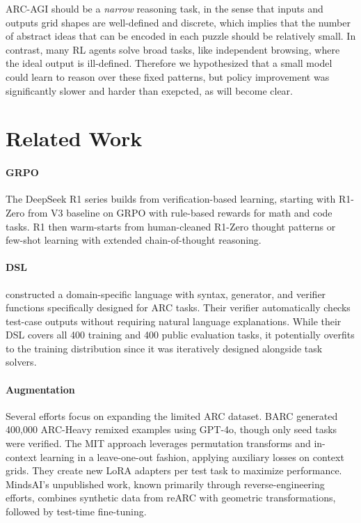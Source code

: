 \documentclass{article}
\begin{document}
ARC-AGI should be a \textit{narrow} reasoning task, in the sense that inputs and outputs grid shapes are well-defined and discrete, which implies that the number of abstract ideas that can be encoded in each puzzle should be relatively small. In contrast, many RL agents solve broad tasks, like independent browsing, where the ideal output is ill-defined. Therefore we hypothesized that a small model could learn to reason over these fixed patterns, but policy improvement was significantly slower and harder than exepcted, as will become clear.

\section{Related Work}

\paragraph{GRPO} The DeepSeek R1 series \cite{r1} builds from verification-based learning, starting with R1-Zero from V3 baseline on GRPO with rule-based rewards for math and code tasks. R1 then warm-starts from human-cleaned R1-Zero thought patterns or few-shot learning with extended chain-of-thought reasoning.

\paragraph{DSL} \cite{Hodel} constructed a domain-specific language with syntax, generator, and verifier functions specifically designed for ARC tasks. Their verifier automatically checks test-case outputs without requiring natural language explanations. While their DSL covers all 400 training and 400 public evaluation tasks, it potentially overfits to the training distribution since it was iteratively designed alongside task solvers.

\paragraph{Augmentation} Several efforts focus on expanding the limited ARC dataset. BARC \cite{barc} generated 400,000 ARC-Heavy remixed examples using GPT-4o, though only seed tasks were verified. The MIT approach \cite{MIT} leverages permutation transforms and in-context learning in a leave-one-out fashion, applying auxiliary losses on context grids. They create new LoRA adapters per test task to maximize performance. MindsAI's unpublished work, known primarily through reverse-engineering efforts, combines synthetic data from reARC with geometric transformations, followed by test-time fine-tuning.
\end{document}
